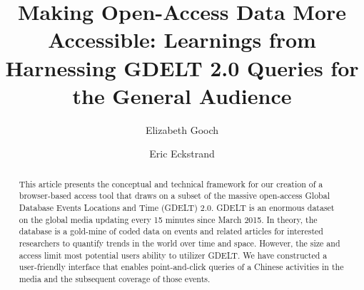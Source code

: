 \documentclass[preprint,authoryear,12pt]{elsarticle/elsarticle}
\begin{document}
\begin{frontmatter}



\title{Making Open-Access Data More Accessible: Learnings from Harnessing GDELT 2.0 Queries for the General Audience
}


\author[add1]{Elizabeth Gooch}
\author[add2]{Eric Eckstrand}

\address[add1]{Defense Resources Management Institute, Naval Postgraduate School}
\address[add2]{Data Science Analytics Group, Naval Postgraduate School}

\begin{abstract}
This article presents the conceptual and technical framework for our creation of a browser-based access tool that draws on a subset of the massive open-access Global Database Events Locations and Time (GDELT) 2.0. GDELT is an enormous dataset on the global media updating every 15 minutes since March 2015. In theory, the database is a gold-mine of coded data on events and related articles for interested researchers to quantify trends in the world over time and space. However, the size and access limit most potential users ability to utilizer GDELT. We have constructed a user-friendly interface that enables point-and-click queries of a Chinese activities in the media and the subsequent coverage of those events. 

\end{abstract}

\begin{keyword}


\end{keyword}

\end{frontmatter}
\end{document}
